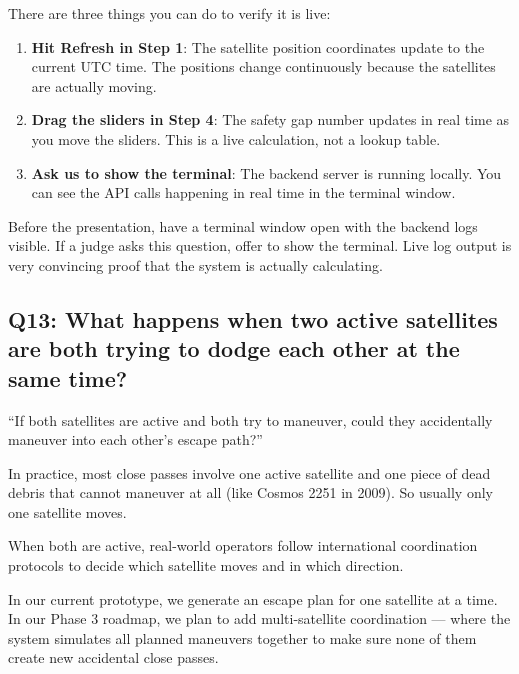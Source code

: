 \documentclass[11pt,a4paper]{article}
\begin{document}
\begin{answerbox}
There are three things you can do to verify it is live:
\begin{enumerate}
    \item \textbf{Hit Refresh in Step 1}: The satellite position coordinates update to the current UTC time. The positions change continuously because the satellites are actually moving.
    \item \textbf{Drag the sliders in Step 4}: The safety gap number updates in real time as you move the sliders. This is a live calculation, not a lookup table.
    \item \textbf{Ask us to show the terminal}: The backend server is running locally. You can see the API calls happening in real time in the terminal window.
\end{enumerate}
\end{answerbox}

\begin{tipbox}
Before the presentation, have a terminal window open with the backend logs visible. If a judge asks this question, offer to show the terminal. Live log output is very convincing proof that the system is actually calculating.
\end{tipbox}

\newpage
\subsection*{Q13: What happens when two active satellites are both trying to dodge each other at the same time?}

\begin{questionbox}
``If both satellites are active and both try to maneuver, could they accidentally maneuver into each other's escape path?''
\end{questionbox}

\begin{answerbox}
In practice, most close passes involve one active satellite and one piece of dead debris that cannot maneuver at all (like Cosmos 2251 in 2009). So usually only one satellite moves.

When both are active, real-world operators follow international coordination protocols to decide which satellite moves and in which direction.

In our current prototype, we generate an escape plan for one satellite at a time. In our Phase 3 roadmap, we plan to add multi-satellite coordination --- where the system simulates all planned maneuvers together to make sure none of them create new accidental close passes.
\end{answerbox}
\end{document}
